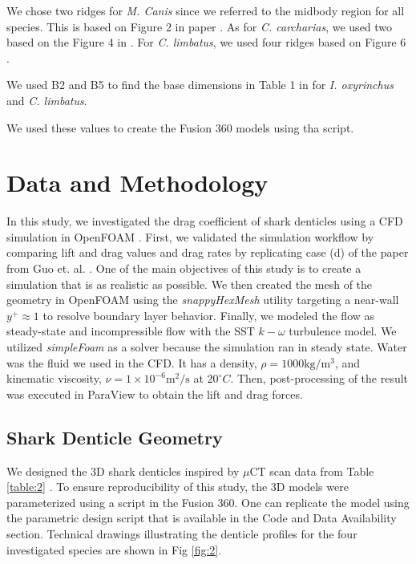\documentclass[graybox]{svmult}
\begin{document}
We chose two ridges for \textit{M. Canis} since we referred to the midbody region for all species. This is based on Figure 2 in paper \cite{ankhelyi_diversity_2018}. As for \textit{C. carcharias}, we used two based on the Figure 4 in \cite{ankhelyi_diversity_2018}. For \textit{C. limbatus}, we used four ridges based on Figure 6 \cite{motta_scale_2012}.

We used B2 and B5 to find the base dimensions in Table 1 in \cite{motta_scale_2012} for \textit{I. oxyrinchus} and \textit{C. limbatus}.

We used these values to create the Fusion 360 models using tha script.

\section{Data and Methodology}
\label{sec:3}

In this study, we investigated the drag coefficient of shark denticles using a CFD simulation in OpenFOAM \cite{openfoam}. First, we validated the simulation workflow by comparing lift and drag values and drag rates by replicating case (d) of the paper from Guo et. al. \cite{guo_experimental_2023}. One of the main objectives of this study is to create a simulation that is as realistic as possible. We then created the mesh of the geometry in OpenFOAM using the \textit{snappyHexMesh} \cite{snappyHexMesh} utility targeting a near-wall $y^+\approx 1 $ to resolve boundary layer behavior. Finally, we modeled the flow as steady-state and incompressible flow with the SST $k-\omega$ turbulence model. We utilized \textit{simpleFoam} \cite{simpleFoam} as a solver because the simulation ran in steady state. Water was the fluid we used in the CFD. It has a density, $\rho = 1000 \text{kg}/\text{m}^3$, and kinematic viscosity, $\nu = 1\times 10^{-6} \text{m}^2/\text{s}$ at $20 ^\circ C$. Then, post-processing of the result was executed in ParaView to obtain the lift and drag forces. 


\subsection{Shark Denticle Geometry}
\label{subsec:2}

We designed the 3D shark denticles inspired by $\mu$CT scan data from Table \ref{table:2} \cite{lloyd_hydrodynamic_2021, patricia_morphological_2019}. To ensure reproducibility of this study, the 3D models were parameterized using a script in the Fusion 360. One can replicate the model using the parametric design script that is available in the Code and Data Availability section. Technical drawings illustrating the denticle profiles for the four investigated species are shown in Fig \ref{fig:2}.
\end{document}
